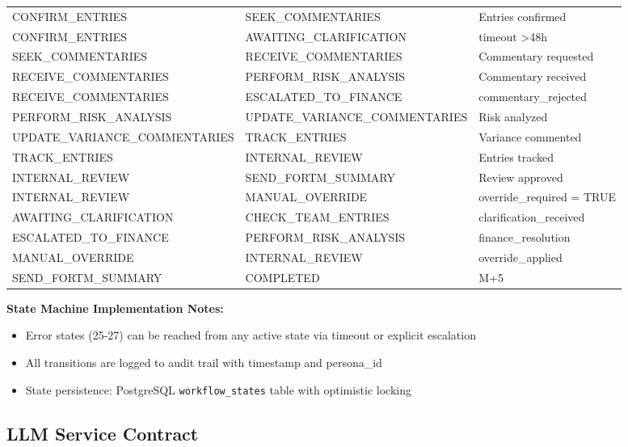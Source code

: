 \begin{longtable}{p{3.5cm} p{3.5cm} p{5.5cm}}
CONFIRM\_ENTRIES & SEEK\_COMMENTARIES & Entries confirmed \\
CONFIRM\_ENTRIES & AWAITING\_CLARIFICATION & timeout \textgreater 48h \\
SEEK\_COMMENTARIES & RECEIVE\_COMMENTARIES & Commentary requested \\
RECEIVE\_COMMENTARIES & PERFORM\_RISK\_ANALYSIS & Commentary received \\
RECEIVE\_COMMENTARIES & ESCALATED\_TO\_FINANCE & commentary\_rejected \\
PERFORM\_RISK\_ANALYSIS & UPDATE\_VARIANCE\_COMMENTARIES & Risk analyzed \\
UPDATE\_VARIANCE\_COMMENTARIES & TRACK\_ENTRIES & Variance commented \\
TRACK\_ENTRIES & INTERNAL\_REVIEW & Entries tracked \\
INTERNAL\_REVIEW & SEND\_FORTM\_SUMMARY & Review approved \\
INTERNAL\_REVIEW & MANUAL\_OVERRIDE & override\_required = TRUE \\
AWAITING\_CLARIFICATION & CHECK\_TEAM\_ENTRIES & clarification\_received \\
ESCALATED\_TO\_FINANCE & PERFORM\_RISK\_ANALYSIS & finance\_resolution \\
MANUAL\_OVERRIDE & INTERNAL\_REVIEW & override\_applied \\
SEND\_FORTM\_SUMMARY & COMPLETED & M+5 \\
\bottomrule
\end{longtable}

\textbf{State Machine Implementation Notes:}
\begin{itemize}
    \item Error states (25-27) can be reached from any active state via timeout or explicit escalation
    \item All transitions are logged to audit trail with timestamp and persona\_id
    \item State persistence: PostgreSQL \texttt{workflow\_states} table with optimistic locking
\end{itemize}

\subsection{LLM Service Contract}
\label{sec:llm-contract}

